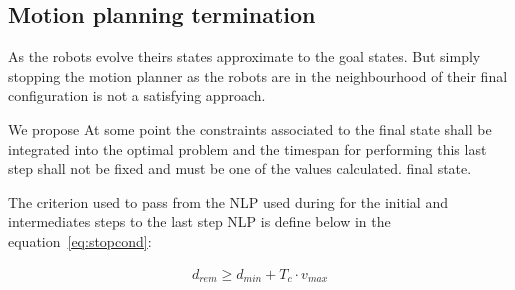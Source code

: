 \documentclass[eprint]{actapoly}
\begin{document}
%
%
%
%
%

\subsection{Motion planning termination}


As the robots evolve theirs states approximate to the goal states.
But simply stopping the motion planner as the robots are in the neighbourhood of
their final configuration is not a satisfying approach.

We propose 
At some point the constraints associated to the final state shall be integrated 
into the optimal problem and the timespan for performing this last
step shall not be fixed and must be one of the values calculated.
final state.

The criterion used to pass from the NLP used during for the initial and 
intermediates steps to the last step NLP 
is define below in the equation~\ref{eq:stopcond}:

\begin{align}
  d_{rem} \geq d_{min} + T_c \cdot v_{max}
\end{align}
\end{document}
